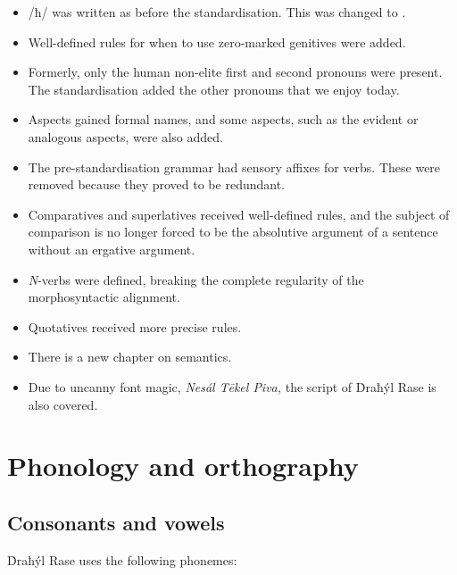 \documentclass{book}
\begin{document}
\begin{itemize}
    \item /ħ/ was written as  before the standardisation. This was changed to .
    \item Well-defined rules for when to use zero-marked genitives were added.
    \item Formerly, only the human non-elite first and second pronouns were present. The standardisation added the other pronouns that we enjoy today.
    \item Aspects gained formal names, and some aspects, such as the evident or analogous aspects, were also added.
    \item The pre-standardisation grammar had sensory affixes for verbs. These were removed because they proved to be redundant.
    \item Comparatives and superlatives received well-defined rules, and the subject of comparison is no longer forced to be the absolutive argument of a sentence without an ergative argument.
    \item \emph{N}-verbs were defined, breaking the complete regularity of the morphosyntactic alignment.
    \item Quotatives received more precise rules.
    \item There is a new chapter on semantics.
    \item Due to uncanny font magic, \emph{Nesál Tēkel Piva,} the script of Ḋraħýl Rase
        is also covered.
\end{itemize}

\chapter{Phonology and orthography}

\section{Consonants and vowels}

Ḋraħýl Rase uses the following phonemes:
\end{document}
